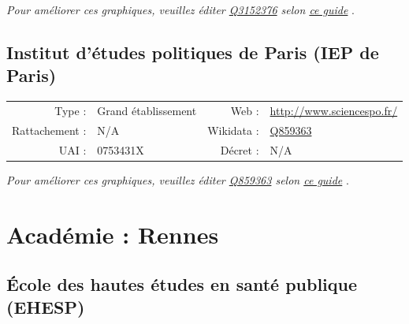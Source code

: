 \documentclass[11pt,french,landscape]{article}
\begin{document}
\textit{\scriptsize Pour améliorer ces graphiques, veuillez éditer \href{https://www.wikidata.org/entity/Q3152376}{Q3152376}  selon \href{https://github.com/cpesr/wikidataESR/blob/master/Rmd/wikidataESR.md}{ce guide}}
.


\newpage

\hypertarget{institut-duxe9tudes-politiques-de-paris-iep-de-paris}{%
\subsection{Institut d'études politiques de Paris (IEP de
Paris)}\label{institut-duxe9tudes-politiques-de-paris-iep-de-paris}}

\begin{tabular*}{0.45\textwidth}{rp{2cm}rl}  
\hline  
Type : & Grand établissement & Web : &\href{http://www.sciencespo.fr/}{http://www.sciencespo.fr/} \\  
Rattachement : & N/A & Wikidata : & \href{https://www.wikidata.org/entity/Q859363}{Q859363} \\  
UAI : & 0753431X & Décret : & N/A \\  
\hline  
\end{tabular*}

\textit{\scriptsize Pour améliorer ces graphiques, veuillez éditer \href{https://www.wikidata.org/entity/Q859363}{Q859363}  selon \href{https://github.com/cpesr/wikidataESR/blob/master/Rmd/wikidataESR.md}{ce guide}}
.


\newpage

\hypertarget{acaduxe9mie-rennes-1}{%
\section{Académie : Rennes}\label{acaduxe9mie-rennes-1}}

\hypertarget{uxe9cole-des-hautes-uxe9tudes-en-santuxe9-publique-ehesp}{%
\subsection{École des hautes études en santé publique
(EHESP)}\label{uxe9cole-des-hautes-uxe9tudes-en-santuxe9-publique-ehesp}}
\end{document}
